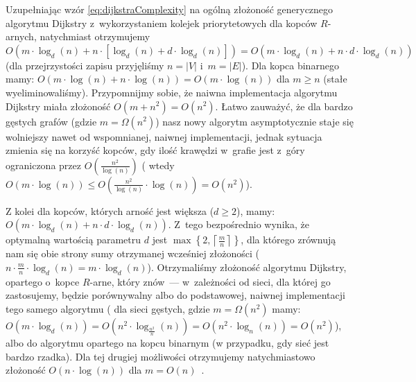 Uzupełniając wzór \ref{eq:dijkstraComplexity} na ogólną złożoność generycznego algorytmu Dijkstry z~wykorzystaniem kolejek priorytetowych dla kopców $R$-arnych, natychmiast otrzymujemy $O \left( m \cdot \log_{d} \left( n \right) + n \cdot \left[ \log_{d} \left( n \right) + d \cdot \log_{d} \left( n \right) \right] \right) = O \left( m \cdot \log_{d} \left( n \right) + n \cdot d \cdot \log_{d} \left( n \right) \right) $ (dla przejrzystości zapisu przyjęliśmy $ n = \left| V\right|$ i~$ m = \left| E \right|$). Dla kopca binarnego mamy: $O \left( m \cdot \log \left( n \right) + n \cdot \log \left( n \right) \right) = O \left( m \cdot \log \left( n \right) \right) $ dla $m \geqslant n $ (stałe wyeliminowaliśmy). Przypomnijmy sobie, że naiwna implementacja algorytmu Dijkstry miała złożoność $ O \left( m + n^{2} \right) = O \left( n^{2} \right)$. Łatwo zauważyć, że dla bardzo gęstych grafów (gdzie $ m = \Omega \left( n^{2} \right) $) nasz nowy algorytm asymptotycznie staje się wolniejszy nawet od wspomnianej, naiwnej implementacji, jednak sytuacja zmienia się na korzyść kopców, gdy ilość krawędzi w~grafie jest z~góry ograniczona przez $ O \left( \frac{n^{2}}{ \log \left( n \right) } \right)$ ( wtedy $ O \left( m \cdot \log \left( n \right) \right) \leqslant O \left( \frac{n^{2}}{\log \left( n \right)} \cdot \log \left( n \right) \right) = O \left( n^{2} \right)$).

Z kolei dla kopców, których arność jest większa ($d \geqslant 2$), mamy: $O \left( m \cdot \log_{d} \left( n \right) + n \cdot d \cdot \log_{d} \left( n \right) \right) $. Z~tego bezpośrednio wynika, że optymalną wartością parametru $d$ jest $ \max \left\{ 2, \left \lceil \frac{m}{n} \right \rceil \right\} $, dla którego zrównują nam się obie strony sumy otrzymanej wcześniej złożoności ($ n \cdot \frac{m}{n} \cdot \log_{d} \left( n \right) = m \cdot \log_{d} \left( n \right) $). Otrzymaliśmy złożoność algorytmu Dijkstry, opartego o~kopce $R$-arne, który znów~--- w~zależności od sieci, dla której go zastosujemy, będzie porównywalny albo do podstawowej, naiwnej implementacji tego samego algorytmu ( dla sieci gęstych, gdzie $ m = \Omega \left( n^{2} \right)$ mamy: $O \left( m \cdot \log_{d} \left( n \right) \right) = O \left( n^{2} \cdot \log_{\frac{n^{2}}{n}} \left( n \right) \right) = O \left( n^{2} \cdot \log_{n} \left( n \right) \right) = O \left( n^{2} \right)$), albo do algorytmu opartego na kopcu binarnym (w przypadku, gdy sieć jest bardzo rzadka). Dla tej drugiej możliwości otrzymujemy natychmiastowo złożoność $O \left( n \cdot \log \left( n \right) \right)$ dla $m = O \left( n \right)$~\cite[$2.2$]{OR}.


